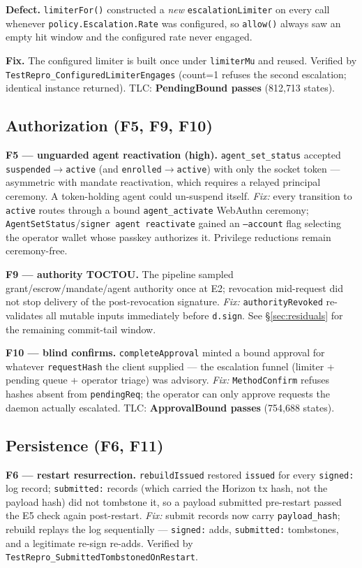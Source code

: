 \documentclass[11pt]{article}
\newcommand{\code}[1]{\texttt{#1}}
\begin{document}
\textbf{Defect.} \code{limiterFor()} constructed a \emph{new}
\code{escalationLimiter} on every call whenever
\code{policy.Escalation.Rate} was configured, so \code{allow()} always saw an
empty hit window and the configured rate never engaged.

\textbf{Fix.} The configured limiter is built once under \code{limiterMu}
and reused. Verified by \code{TestRepro\_ConfiguredLimiterEngages}
(count=1 refuses the second escalation; identical instance returned).
TLC: \textbf{PendingBound passes} (812{,}713 states).

\subsection{Authorization (F5, F9, F10)}

\textbf{F5 — unguarded agent reactivation (high).} \code{agent\_set\_status}
accepted \code{suspended}$\to$\code{active} (and \code{enrolled}$\to$\code{active})
with only the socket token — asymmetric with mandate reactivation, which
requires a relayed principal ceremony. A token-holding agent could
un-suspend itself. \emph{Fix:} every transition to \code{active} routes through
a bound \code{agent\_activate} WebAuthn ceremony;
\code{AgentSetStatus}/\code{signer agent reactivate} gained an \code{--account}
flag selecting the operator wallet whose passkey authorizes it. Privilege
reductions remain ceremony-free.

\textbf{F9 — authority TOCTOU.} The pipeline sampled grant/escrow/mandate/agent
authority once at E2; revocation mid-request did not stop delivery of the
post-revocation signature. \emph{Fix:} \code{authorityRevoked} re-validates all
mutable inputs immediately before \code{d.sign}. See \S\ref{sec:residuals}
for the remaining commit-tail window.

\textbf{F10 — blind confirms.} \code{completeApproval} minted a bound approval
for whatever \code{requestHash} the client supplied — the escalation funnel
(limiter + pending queue + operator triage) was advisory. \emph{Fix:}
\code{MethodConfirm} refuses hashes absent from \code{pendingReq}; the operator
can only approve requests the daemon actually escalated.
TLC: \textbf{ApprovalBound passes} (754{,}688 states).

\subsection{Persistence (F6, F11)}

\textbf{F6 — restart resurrection.} \code{rebuildIssued} restored \code{issued}
for every \code{signed:} log record; \code{submitted:} records (which carried
the Horizon tx hash, not the payload hash) did not tombstone it, so a payload
submitted pre-restart passed the E5 check again post-restart.
\emph{Fix:} submit records now carry \code{payload\_hash}; rebuild replays the
log sequentially — \code{signed:} adds, \code{submitted:} tombstones, and a
legitimate re-sign re-adds. Verified by
\code{TestRepro\_SubmittedTombstonedOnRestart}.
\end{document}
